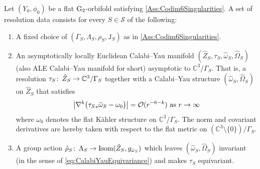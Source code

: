 \documentclass[11pt,a4paper]{scrartcl}
\newcommand{\col}{\colon \thinspace}
\newcommand{\G}{\textup{G}}
\numberwithin{equation}{section}
\theoremstyle{plain}
\theoremstyle{definition}
\theoremstyle{remark}
\begin{document}
\begin{definition}\label{def:RData}
Let $(Y_0,\phi_0)$ be a flat $\G_2$-orbifold satisfying \autoref{Ass:Codim6Singularities}. A set of resolution data consists for every $S \in \mathcal{S}$ of the following:
\begin{enumerate}
\item A fixed choice of $(\Gamma_S, \Lambda_S,\rho_S,\mathtt{J}_S)$ as in \autoref{Ass:Codim6Singularities}.
\item \label{def:ALE-space}  An asymptotically locally Euclidean Calabi--Yau manifold $(\hat{Z}_S,\tau_S,\hat{\omega}_S,\hat{\Omega}_S)$ (also ALE Calabi--Yau manifold for short) asymptotic to $\mathbb{C}^3/\Gamma_S$. That is, a resolution $\tau_S \col \hat{Z}_S \to \mathbb{C}^3/\Gamma_S$ together with a Calabi--Yau structure $(\hat{\omega}_S,\hat{\Omega}_S)$ on $\hat{Z}_S$ that satisfies 
\begin{equation}\label{eq:ALE-Kählerform_decay}
\big\vert \nabla^k \big({\tau_S}_*\hat{\omega}_S - \omega_0\big) \big\vert = \mathcal{O}(r^{-6-k}) \textup{ as $r \to \infty$}
\end{equation} 
where $\omega_0$ denotes the flat Kähler structure on $\mathbb{C}^3/\Gamma_S$. The norm and covariant derivatives are hereby taken with respect to the flat metric on $(\mathbb{C}^3\setminus\{0\})/\Gamma_S$.
\item \label{bul: lifting group action in definition of R-data} A group action $\hat{\rho}_S \col \Lambda_S \to \textup{Isom}(\hat{Z}_S,g_{\hat{\omega}_S})$ which leaves $(\hat{\omega}_S,\hat{\Omega}_S)$ invariant (in the sense of \eqref{eq:CalabiYauEquivariance}) and makes $\tau_S$ equivariant.
\end{enumerate}
\end{definition}
\end{document}
